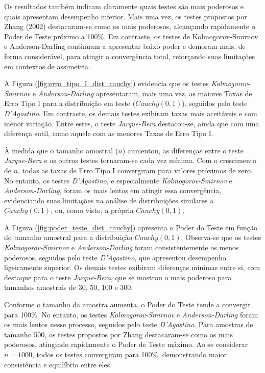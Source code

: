 \documentclass[a4paper,11pt]{article} %
\begin{document}
\vspace{0.5cm}

Os resultados também indicam claramente quais testes são mais poderosos e quais apresentam desempenho inferior. Mais uma vez, os testes propostos por Zhang (2002) destacaram-se como os mais poderosos, alcançando rapidamente o Poder de Teste próximo a 100\%. Em contraste, os testes de Kolmogorov-Smirnov e Anderson-Darling continuam a apresentar baixo poder e demoram mais, de forma considerável, para atingir a convergência total, reforçando suas limitações em contextos de assimetria.

\vspace{0.5cm}

A Figura (\ref{fig:erro_tipo_I_dist_cauchy}) evidencia que os testes \textit{Kolmogorov-Smirnov} e \textit{Anderson-Darling} apresentaram, mais uma vez, as maiores Taxas de Erro Tipo I para a distribuição em teste ($Cauchy(0, 1)$), seguidos pelo teste \textit{D'Agostino}. Em contraste, os demais testes exibiram taxas mais aceitáveis e com menor variação. Entre estes, o teste \textit{Jarque-Bera} destacou-se, ainda que com uma diferença sutil, como aquele com as menores Taxas de Erro Tipo I.

À medida que o tamanho amostral ($n$) aumentou, as diferenças entre o teste \textit{Jarque-Bera} e os outros testes tornaram-se cada vez mínima. Com o crescimento de $n$, todas as taxas de Erro Tipo I convergiram para valores próximos de zero. No entanto, os testes \textit{D'Agostino}, e especialmente \textit{Kolmogorov-Smirnov} e \textit{Anderson-Darling}, foram os mais lentos em atingir essa convergência, evidenciando suas limitações na análise de distribuições similares a $Cauchy(0, 1)$, ou, como visto, a própria  $Cauchy(0, 1)$.

\vspace{0.5cm}

A Figura (\ref{fig:poder_teste_dist_cauchy}) apresenta o Poder do Teste em função do tamanho amostral para a distribuição $Cauchy(0, 1)$. Observa-se que os testes \textit{Kolmogorov-Smirnov} e \textit{Anderson-Darling} foram consistentemente os menos poderosos, seguidos pelo teste \textit{D'Agostino}, que apresentou desempenho ligeiramente superior. Os demais testes exibiram diferenças mínimas entre si, com destaque para o teste \textit{Jarque-Bera}, que se mostrou o mais poderoso para tamanhos amostrais de 30, 50, 100 e 300.

Conforme o tamanho da amostra aumenta, o Poder do Teste tende a convergir para 100\%. No entanto, os testes \textit{Kolmogorov-Smirnov} e \textit{Anderson-Darling} foram os mais lentos nesse processo, seguidos pelo teste \textit{D'Agostino}. Para amostras de tamanho 500, os testes propostos por Zhang destacaram-se como os mais poderosos, atingindo rapidamente o Poder de Teste máximo. Ao se considerar $n = 1000$, todos os testes convergiram para 100\%, demonstrando maior consistência e equilíbrio entre eles.
\end{document}

